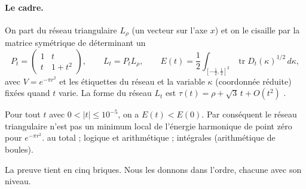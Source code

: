 \paragraph{Le cadre.} On part du réseau triangulaire $L_\rho$ (un vecteur sur l'axe $x$) et on le cisaille par la
matrice symétrique de déterminant un
\[
P_t=\begin{pmatrix}1&t\\t&1+t^2\end{pmatrix},\qquad L_t=P_tL_\rho,\qquad
E(t)=\frac12\int_{[-\frac12,\frac12]^2}\operatorname{tr}D_t(\kappa)^{1/2}\,d\kappa ,
\]
avec $V=e^{-\pi r^2}$ et les étiquettes du réseau et la variable $\kappa$ (coordonnée réduite) fixées quand $t$ varie.
La forme du réseau $L_t$ est $\tau(t)=\rho+\sqrt3\,t+O(t^2)$ \tierC.

\begin{theorem}[B2]\label{ch3:thm:b2}
Pour tout $t$ avec $0<|t|\le10^{-5}$, on a $E(t)<E(0)$. Par conséquent le réseau triangulaire n'est pas un minimum local de
l'énergie harmonique de point zéro pour $e^{-\pi r^2}$. \tierC{} au total ; logique et arithmétique \tierAs{} ; intégrales
\tierC{} (arithmétique de boules).
\end{theorem}
\noindent La preuve tient en cinq briques. Nous les donnons dans l'ordre, chacune avec son niveau.

